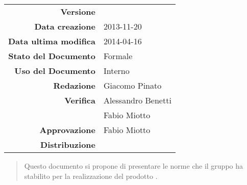 



\newcommand{\Versione}{\versioneNormeDiProgetto{}}	%
\newcommand{\Data}{2013-11-20}						%
\newcommand{\DataUltimaModifica}{2014-04-16}
\newcommand{\TipoDocumento}{Norme di Progetto}		%



\begin{center}
\begin{tabular}{r|l}
\textbf{Versione} & \Versione{} \\
\textbf{Data creazione} & \Data{} \\
\textbf{Data ultima modifica} & \DataUltimaModifica{} \\
\textbf{Stato del Documento} & Formale \\		%
\textbf{Uso del Documento} & Interno \\			%
\textbf{Redazione} & Giacomo Pinato\\			%
\textbf{Verifica} & Alessandro Benetti \\
& Fabio Miotto\\			%
\textbf{Approvazione} & Fabio Miotto \\			%
\textbf{Distribuzione} & \parbox[t]{4cm}{\NomeGruppo{}}\\
\end{tabular}
\end{center}

\vspace{0.05in}

\begin{abstract}
\begin{center}
Questo documento si propone di presentare le norme che il gruppo \NomeGruppo{} ha stabilito per la realizzazione del prodotto \Progetto{}.
\end{center}
\end{abstract}


